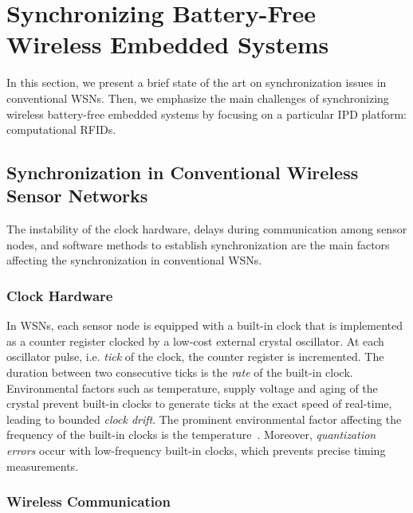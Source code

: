\documentclass[journal,draftcls,onecolumn,12pt,twoside]{IEEEtranTCOM}
\begin{document}
\section{Synchronizing Battery-Free Wireless Embedded Systems}
\label{sec:Related-Work}

In this section, we present a brief  state of the art on synchronization issues in conventional WSNs. Then, we emphasize the 
main challenges of synchronizing wireless battery-free embedded systems by focusing on a particular IPD platform: computational RFIDs. 

\subsection{Synchronization in Conventional Wireless Sensor Networks}
\label{sec:WSN-Sync}

The instability of the clock hardware, delays during communication among sensor nodes, and software methods to establish synchronization are the main factors affecting the synchronization in conventional WSNs. 

\subsubsection{Clock Hardware}

In WSNs, each sensor node is equipped with a built-in clock that is implemented as a counter register clocked by a low-cost external crystal oscillator. At each oscillator pulse, i.e. \emph{tick} of the clock, the counter register is incremented. The duration between two consecutive ticks is the \emph{rate} of the built-in clock. Environmental factors such as temperature, supply voltage and aging of the crystal prevent built-in clocks to generate ticks at the exact speed of real-time, leading to bounded \emph{clock drift}. The prominent environmental factor affecting the frequency of the built-in clocks is the temperature~\cite{Schmid:2009,Schmid:2010}. Moreover, \emph{quantization errors} occur with low-frequency built-in clocks, which prevents precise timing measurements. 

\subsubsection{Wireless Communication}
\end{document}
